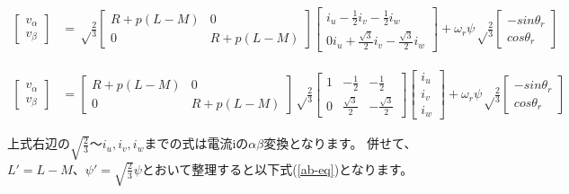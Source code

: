 \begin{fleqn}[8pt]
{\begin{align*}
    \begin{bmatrix}
        v_{\alpha} \\
        v_{\beta}
    \end{bmatrix}
    &= \sqrt\frac{2}{3}
    \begin{bmatrix}
        R+p(L-M) & 0 \\
        0 & R+p(L-M)
    \end{bmatrix}
    \begin{bmatrix}
        i_{u} - \frac{1}{2}i_{v} - \frac{1}{2}i_{w} \\
        0i_{u} + \frac{\sqrt{3}}{2}i_{v} - \frac{\sqrt{3}}{2}i_{w}
    \end{bmatrix}
    + \omega_{r}\psi\sqrt\frac{2}{3}
    \begin{bmatrix}
        -sin\theta_{r} \\
        cos\theta_{r}
    \end{bmatrix}
\end{align*}

\begin{align*}
    \begin{bmatrix}
        v_{\alpha} \\
        v_{\beta}
    \end{bmatrix}
    &=
    \begin{bmatrix}
        R+p(L-M) & 0 \\
        0 & R+p(L-M)
    \end{bmatrix}
    \sqrt\frac{2}{3}
    \begin{bmatrix}
        1 & -\frac{1}{2} & -\frac{1}{2} \\
        0 & \frac{\sqrt{3}}{2} & -\frac{\sqrt{3}}{2}
    \end{bmatrix}
    \begin{bmatrix}
        i_{u} \\
        i_{v} \\
        i_{w}
    \end{bmatrix}
    + \omega_{r}\psi\sqrt\frac{2}{3}
    \begin{bmatrix}
        -sin\theta_{r} \\
        cos\theta_{r}
    \end{bmatrix}
\end{align*}
}
\end{fleqn}

上式右辺の$\sqrt{\frac{2}{3}}$〜$i_{u},i_{v},i_{w}$までの式は電流iの$\alpha\beta$変換となります。
併せて、$L' = L-M$、$\psi'=\sqrt{\frac{2}{3}}\psi$とおいて整理すると以下式(\ref{ab-eq})となります。

